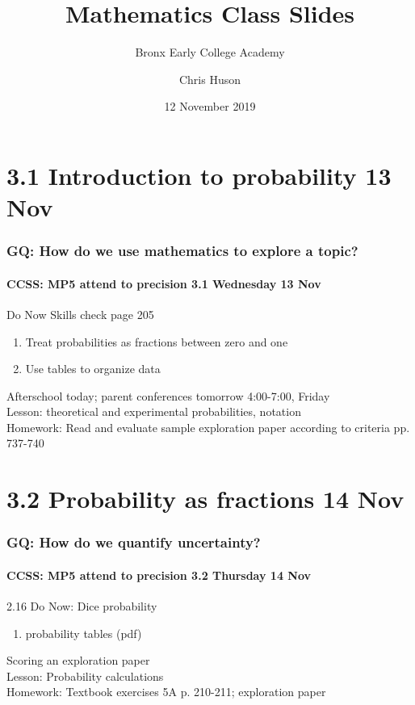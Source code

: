 \documentclass{beamer}
\title{Mathematics Class Slides}
\subtitle{Bronx Early College Academy}
\author{Chris Huson}
\date{12 November 2019}
\begin{document}
\frame{\titlepage}
\section[Outline]{}
\frame{\tableofcontents}


\section{3.1 Introduction to probability 13 Nov}
\frame
{
  \frametitle{GQ: How do we use mathematics to explore a topic?}
  \framesubtitle{CCSS: MP5 attend to precision \hfill \alert{3.1 Wednesday 13 Nov}}

  \begin{block}{Do Now Skills check page 205}
  \begin{enumerate}
      \item Treat probabilities as fractions between zero and one 
      \item Use tables to organize data
  \end{enumerate}
  \end{block}
  Afterschool today; parent conferences tomorrow 4:00-7:00, Friday\\ \smallskip
  Lesson: theoretical and experimental probabilities, notation \\ \smallskip
  Homework: Read and evaluate sample exploration paper according to criteria pp. 737-740
}

\section{3.2 Probability as fractions 14 Nov}
\frame
{
  \frametitle{GQ: How do we quantify uncertainty?}
  \framesubtitle{CCSS: MP5 attend to precision \hfill \alert{3.2 Thursday 14 Nov}}

  \begin{block}{2.16 Do Now: Dice probability}
  \begin{enumerate}
      \item probability tables (pdf)
  \end{enumerate}
  \end{block}
  Scoring an exploration paper \\
  Lesson: Probability calculations \\ \smallskip
  Homework: Textbook exercises 5A p. 210-211; exploration paper
}
\end{document}
